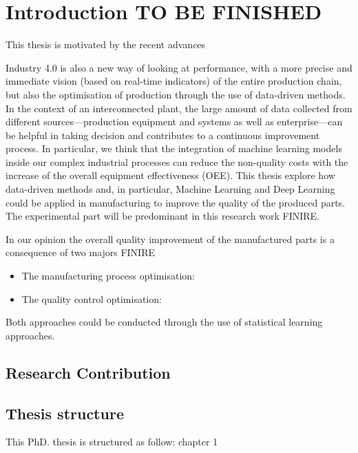 \chapter*{Introduction TO BE FINISHED}
\thispagestyle{empty}

This thesis is motivated by the recent advances

Industry 4.0 is also a new way of looking at performance, with a more precise and immediate vision (based on real-time indicators) of the entire production chain, but also the optimisation of production through the use of data-driven methods. In the context of an interconnected plant, the large amount of data collected from different sources—production equipment and systems as well as enterprise—can be helpful in taking decision and contributes to a continuous improvement process. In particular, we think that the integration of machine learning models inside our complex industrial processes can reduce the non-quality costs with the increase of the overall equipment effectiveness (OEE). This thesis explore how data-driven methods and, in particular, Machine Learning and Deep Learning could be applied in manufacturing to improve the quality of the produced parts. The experimental part will be predominant in this research work FINIRE. 



In our opinion the overall quality improvement of the manufactured parts is a consequence of two majors FINIRE

\begin{itemize}
    \item The manufacturing process optimisation:
    \item The quality control optimisation:
\end{itemize}

Both approaches could be conducted through the use of statistical learning approaches.

\section*{Research Contribution}


\section*{Thesis structure}

This PhD. thesis is structured as follow: chapter 1 

